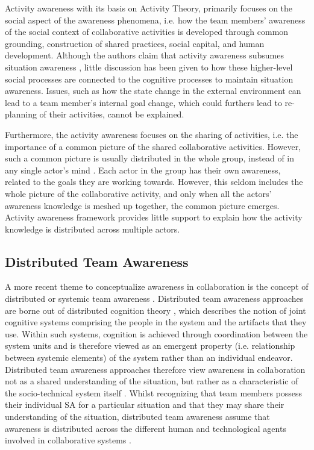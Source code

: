 Activity awareness with its basis on Activity Theory, primarily focuses on the social aspect of the awareness phenomena, i.e. how the team members' awareness of the social context of collaborative activities is developed through common grounding, construction of shared practices, social capital, and human development. Although the authors claim that activity awareness subsumes situation awareness \cite{carroll2003a}, little discussion has been given to how these higher-level social processes are connected to the cognitive processes to maintain situation awareness. Issues, such as how the state change in the external environment can lead to a team member's internal goal change, which could furthers lead to re-planning of their activities, cannot be explained. 

Furthermore, the activity awareness focuses on the sharing of activities, i.e. the importance of a common picture of the shared collaborative activities. However, such a common picture is usually distributed in the whole group, instead of in any single actor's mind \cite{Stanton2009}. Each actor in the group has their own awareness, related to the goals they are working towards. However, this seldom includes the whole picture of the collaborative activity, and only when all the actors' awareness knowledge is meshed up together, the common picture emerges. Activity awareness framework provides little support to explain how the activity knowledge is distributed across multiple actors.

\subsection{Distributed Team Awareness} %
\label{sub:distributed_team_awareness}
A more recent theme to conceptualize awareness in collaboration is the concept of distributed or systemic team awareness \cite{Stanton2009,artman1998situation}. Distributed team awareness approaches are borne out of distributed cognition theory \cite{hutchins1995cognition}, which describes the notion of joint cognitive systems comprising the people in the system and the artifacts that they use. Within such systems, cognition is achieved through coordination between the system units \cite{artman1998situation} and is therefore viewed as an emergent property (i.e. relationship between systemic elements) of the system rather than an individual endeavor. Distributed team awareness approaches therefore view awareness in collaboration not as a shared understanding of the situation, but rather as a characteristic of the socio-technical system itself \cite{artman1998situation}. Whilst recognizing that team members possess their individual SA for a particular situation and that they may share their understanding of the situation, distributed team awareness assume that awareness is distributed across the different human and technological agents involved in collaborative systems \cite{Stanton2009}.

